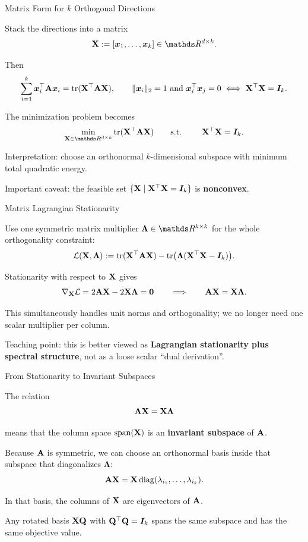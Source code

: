 \documentclass[11pt,compress,t,notes=noshow, xcolor=table]{beamer}
\newcommand{\Lambdamat}{\bm{\Lambda}}
\begin{document}
\begin{framei}[fs=small]{Matrix Form for $k$ Orthogonal Directions}
\item Stack the directions into a matrix
$$
\Xmat := [\xv_1,\dots,\xv_k] \in \R^{d \times k}.
$$
\item Then
$$
\sum\limits_{i=1}^k \bm{x}_i^\top \mathbf{A} \bm{x}_i = \operatorname{tr}(\mathbf{X}^\top \mathbf{A} \mathbf{X}),
\qquad
\|\bm{x}_i\|_2 = 1 \text{ and } \bm{x}_i^\top \bm{x}_j = 0
\iff
\mathbf{X}^\top \mathbf{X} = \bm{I}_k.
$$
\item The minimization problem becomes
$$
\min_{\Xmat \in \R^{d \times k}} \trace(\Xmat^\top \A \Xmat)
\qquad
\text{s.t. } \qquad
\Xmat^\top \Xmat = \id_k.
$$
\item Interpretation: choose an orthonormal $k$-dimensional subspace with minimum total quadratic energy.
\item Important caveat: the feasible set $\{\mathbf{X} \mid \mathbf{X}^\top \mathbf{X} = \bm{I}_k\}$ is \textbf{nonconvex}.
\end{framei}


\begin{framei}[fs=small]{Matrix Lagrangian Stationarity}
\item Use one symmetric matrix multiplier $\Lambdamat \in \R^{k \times k}$ for the whole orthogonality constraint:
$$
\mathcal{L}(\Xmat,\Lambdamat)
:=
\trace(\Xmat^\top \A \Xmat)
-
\trace\!\big(\Lambdamat(\Xmat^\top \Xmat - \id_k)\big).
$$
\item Stationarity with respect to $\mathbf{X}$ gives
$$
\nabla_{\Xmat} \mathcal{L}
=
2 \A \Xmat - 2 \Xmat \Lambdamat
=
\zero
\qquad \Longrightarrow \qquad
\A \Xmat = \Xmat \Lambdamat.
$$
\item This simultaneously handles unit norms and orthogonality; we no longer need one scalar multiplier per column.
\item Teaching point: this is better viewed as \textbf{Lagrangian stationarity plus spectral structure}, not as a loose scalar \enquote{dual derivation}.
\end{framei}


\begin{framei}[fs=small]{From Stationarity to Invariant Subspaces}
\item The relation
$$
\A \Xmat = \Xmat \Lambdamat
$$
\item means that the column space $\operatorname{span}(\mathbf{X})$ is an \textbf{invariant subspace} of $\mathbf{A}$.
\item Because $\mathbf{A}$ is symmetric, we can choose an orthonormal basis inside that subspace that diagonalizes $\Lambdamat$:
$$
\mathbf{A} \mathbf{X}
=
\mathbf{X} \operatorname{diag}(\lambda_{i_1},\dots,\lambda_{i_k}).
$$
\item In that basis, the columns of $\mathbf{X}$ are eigenvectors of $\mathbf{A}$.
\item Any rotated basis $\mathbf{X} \mathbf{Q}$ with $\mathbf{Q}^\top \mathbf{Q} = \bm{I}_k$ spans the same subspace and has the same objective value.
\end{framei}
\end{document}
